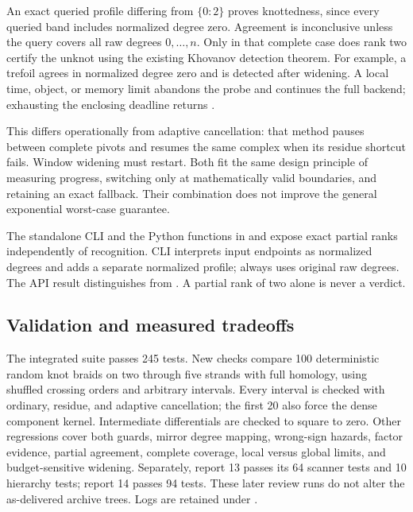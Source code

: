 An exact queried profile differing from $\{0:2\}$ proves knottedness,
since every queried band includes normalized degree zero. Agreement is
inconclusive unless the query covers all raw degrees $0,\ldots,n$.
Only in that complete case does rank two certify the unknot using the
existing Khovanov detection theorem. For example, a trefoil agrees in
normalized degree zero and is detected after widening. A local time,
object, or memory limit abandons the probe and continues the full backend;
exhausting the enclosing deadline returns .

This differs operationally from adaptive cancellation: that method pauses
between complete pivots and resumes the same complex when its residue
shortcut fails. Window widening must restart. Both fit the same design
principle of measuring progress, switching only at mathematically valid
boundaries, and retaining an exact fallback. Their combination does not
improve the general exponential worst-case guarantee.

The standalone  CLI and the Python functions in
 and 
expose exact partial ranks independently of recognition. CLI
 interprets input endpoints as normalized degrees and
adds a separate normalized profile;  always uses original
raw degrees. The API result distinguishes  from
. A partial rank of two alone is never a verdict.

\subsection{Validation and measured tradeoffs}
The integrated suite passes 245 tests. New checks compare 100 deterministic
random knot braids on two through five strands with full homology, using
shuffled crossing orders and arbitrary intervals. Every interval is checked
with ordinary, residue, and adaptive cancellation; the first 20 also force
the dense component kernel. Intermediate differentials are checked to
square to zero. Other regressions cover both guards, mirror degree mapping,
wrong-sign hazards, factor evidence, partial agreement, complete coverage,
local versus global limits, and budget-sensitive widening.
Separately, report 13 passes its 64 scanner tests and 10 hierarchy tests;
report 14 passes 94 tests. These later review runs do not alter the
as-delivered archive trees. Logs are retained under .

